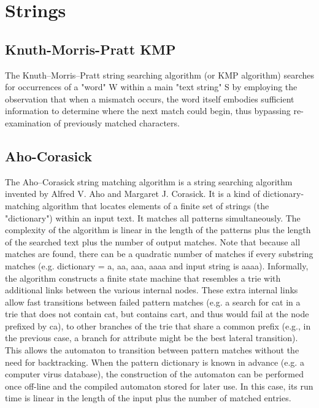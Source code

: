 \documentclass[10pt,letterpaper,twocolumn,twosided]{article}
\newcommand{\codigofuente}[1]{

\dotfill
}
\begin{document}
\section{Strings}

\subsection{Knuth-Morris-Pratt KMP}

The Knuth–Morris–Pratt string searching algorithm (or KMP algorithm) searches for occurrences of a "word" W within a main "text string" S by employing the observation that when a mismatch occurs, the word itself embodies sufficient information to determine where the next match could begin, thus bypassing re-examination of previously matched characters.

\codigofuente{src/string/kmp.cpp}

\subsection{Aho-Corasick}

The Aho–Corasick string matching algorithm is a string searching algorithm invented by Alfred V. Aho and Margaret J. Corasick. It is a kind of dictionary-matching algorithm that locates elements of a finite set of strings (the "dictionary") within an input text. It matches all patterns simultaneously. The complexity of the algorithm is linear in the length of the patterns plus the length of the searched text plus the number of output matches. Note that because all matches are found, there can be a quadratic number of matches if every substring matches (e.g. dictionary = a, aa, aaa, aaaa and input string is aaaa).
Informally, the algorithm constructs a finite state machine that resembles a trie with additional links between the various internal nodes. These extra internal links allow fast transitions between failed pattern matches (e.g. a search for cat in a trie that does not contain cat, but contains cart, and thus would fail at the node prefixed by ca), to other branches of the trie that share a common prefix (e.g., in the previous case, a branch for attribute might be the best lateral transition). This allows the automaton to transition between pattern matches without the need for backtracking.
When the pattern dictionary is known in advance (e.g. a computer virus database), the construction of the automaton can be performed once off-line and the compiled automaton stored for later use. In this case, its run time is linear in the length of the input plus the number of matched entries.
\end{document}

